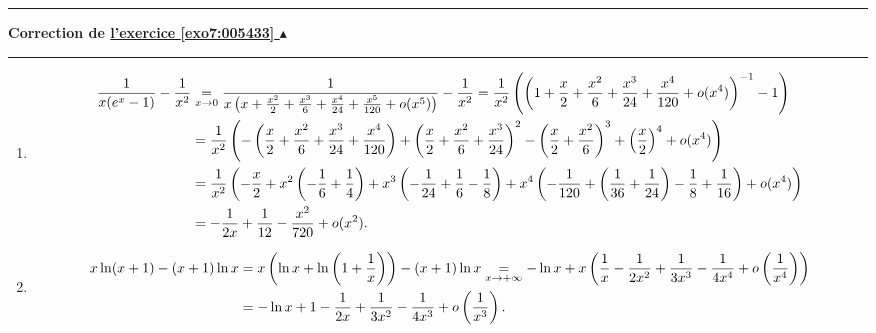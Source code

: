 \documentclass[11pt,a4paper]{article}
\newcounter{exo}
\newcommand{\correction}[1]{\hypertarget{cor7:#1}{}\label{cor7:#1}{\bf Correction de \hyperlink{exo7:#1}{l'exercice \ref{exo7:#1} $\blacktriangle$}}\vspace{1mm}\hrule\vspace{1mm}}
\newcommand{\fincorrection}{\vspace{1mm}\hrule\vspace*{7mm}}
\begin{document}
\begin{center}
\end{center}
\fincorrection
\correction{005433}
\begin{enumerate}
 \item 
\begin{align*}\ensuremath
\frac{1}{x(e^x-1)}-\frac{1}{x^2}&\underset{x\rightarrow0}{=}\frac{1}{x\left(x+\frac{x^2}{2}+\frac{x^3}{6}+\frac{x^4}{24}+\frac{x^5}{120}+o(x^5)\right)}-\frac{1}{x^2}=\frac{1}{x^2}\left(\left(1+\frac{x}{2}+\frac{x^2}{6}+\frac{x^3}{24}+\frac{x^4}{120}+o(x^4)\right)^{-1}-1\right)\\
 &=\frac{1}{x^2}\left(-\left(\frac{x}{2}+\frac{x^2}{6}+\frac{x^3}{24}+\frac{x^4}{120}\right)+\left(\frac{x}{2}+\frac{x^2}{6}+\frac{x^3}{24}\right)^2-\left(\frac{x}{2}+\frac{x^2}{6}\right)^3+\left(\frac{x}{2}\right)^4+o(x^4)\right)\\
 &=\frac{1}{x^2}\left(-\frac{x}{2}+x^2\left(-\frac{1}{6}+\frac{1}{4}\right)+x^3\left(-\frac{1}{24}+\frac{1}{6}-\frac{1}{8}\right)
 +x^4\left(-\frac{1}{120}+\left(\frac{1}{36}+\frac{1}{24}\right)-\frac{1}{8}+\frac{1}{16}\right)+o(x^4)\right)\\
 &=-\frac{1}{2x}+\frac{1}{12}-\frac{x^2}{720}+o(x^2).
\end{align*}

\begin{center}
\end{center}
 \item 
 
\begin{align*}\ensuremath
x\ln(x+1)-(x+1)\ln x&=x\left(\ln x+\ln\left(1+\frac{1}{x}\right)\right)-(x+1)\ln x\underset{x\rightarrow+\infty}{=}-\ln
 x+x\left(\frac{1}{x}-\frac{1}{2x^2}+\frac{1}{3x^3}-\frac{1}{4x^4}+o\left(\frac{1}{x^4}\right)\right)\\
 &=-\ln x+1-\frac{1}{2x}+\frac{1}{3x^2}-\frac{1}{4x^3}+o\left(\frac{1}{x^3}\right).
\end{align*}

\begin{center}
\end{center}
\end{enumerate}
\end{document}
